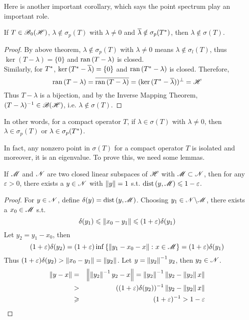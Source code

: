 Here is another important corollary, which says the point spectrum play an important role.
\begin{cor}
	If $T \in \mathscr{B}_{0}\mathscr{(H)}$, $\lambda \notin \sigma_p(T)$ with $\lambda \neq 0$ and $\overline{\lambda} \notin \sigma_p(T^{*})$, then $\lambda \notin \sigma(T)$.
\end{cor}
\begin{proof}
	By above theorem, $\lambda \notin \sigma_p(T)$ with $\lambda \neq 0$ means $\lambda \notin \sigma_l(T)$, thus $\ker{(T-\lambda)} = \{0\}$ and $\operatorname{ran}{(T-\lambda)}$ is closed.\\ Similarly, for $T^{*}$, $\ker{(T^{*}-\overline{\lambda})} = \{0\}$ and $\operatorname{ran}{(T^{*}-\lambda)}$ is closed. Therefore,
	\begin{equation*}
		\operatorname{ran}{(T-\lambda)} = \overline{\operatorname{ran}{(T-\lambda)}} = (\ker{(T^{*}-\overline{\lambda})})^{\bot} = \mathscr{H}
	\end{equation*}
	Thus $T-\lambda$ is a bijection, and by the Inverse Mapping Theorem, $(T-\lambda)^{-1} \in \mathscr{B(H)}$, i.e. $\lambda \notin \sigma(T)$.
\end{proof}
\begin{rem}
	In other words, for a compact operator $T$, if $\lambda \in \sigma(T)$ with $\lambda \neq 0$, then $\lambda \in \sigma_p(T)$ or $\lambda \in \sigma_p(T^{*})$.
\end{rem}

In fact, any nonzero point in $\sigma(T)$ for a compact operator $T$ is isolated and moreover, it is an eigenvalue. To prove this, we need some lemmas.

\begin{lem}
	If $\mathscr{M}$ and $\mathscr{N}$ are two closed linear subspaces of $\mathscr{H}$ with $\mathscr{M} \subset \mathscr{N}$, then for any $\varepsilon > 0$, there exists a $y \in \mathscr{N}$ with $\left\lVert y\right\lVert = 1$ s.t. $\operatorname{dist}{(y,\mathscr{M})} \leqslant 1-\varepsilon$.
\end{lem}
\begin{proof}
	For $y \in \mathscr{N}$, define $\delta(y) = \operatorname{dist}{(y,\mathscr{M})}$. Choosing $y_1 \in \mathscr{N} \backslash \mathscr{M}$, there exists a $x_0 \in \mathscr{M}$ s.t.
	\begin{equation*}
		\delta(y_1) \leqslant \left\lVert x_0-y_1\right\lVert \leqslant (1+\varepsilon) \delta (y_1)
	\end{equation*}
	Let $y_2 = y_1-x_0$, then
	\begin{equation*}
		(1+\varepsilon)\delta(y_2) = (1+\varepsilon)\operatorname{inf}{\{\left\lVert y_1-x_0-x\right\lVert \colon x \in \mathscr{M}\}} = (1+\varepsilon)\delta(y_1)
	\end{equation*}
	Thus $(1+\varepsilon)\delta(y_2) > \left\lVert x_0 - y_1\right\lVert = \left\lVert y_2\right\lVert$. Let $y = \left\lVert y_2\right\lVert^{-1}y_2$, then $y_2 \in \mathscr{N}$.
	\begin{eqnarray*}
		\left\lVert y-x\right\lVert &=& \left\lVert\left\lVert y_2\right\lVert^{-1}y_2-x\right\lVert = \left\lVert y_2\right\lVert^{-1}\left\lVert y_2-\left\lVert y_2\right\lVert x\right\lVert \\
		&>& ((1+\varepsilon)\delta(y_2))^{-1} \left\lVert y_2-\left\lVert y_2\right\lVert x\right\lVert \\
		&\geqslant& (1+\varepsilon)^{-1} > 1 - \varepsilon
	\end{eqnarray*}
\end{proof}

